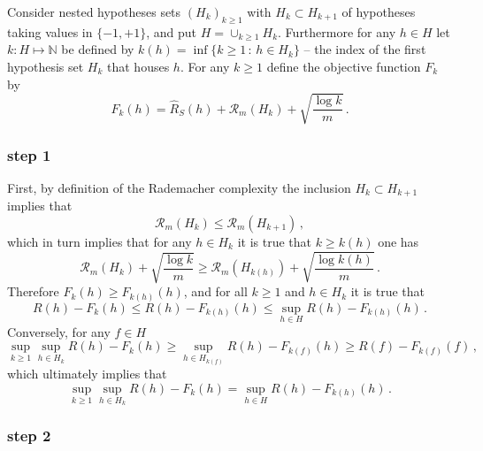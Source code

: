\documentclass[a4paper]{article}
\begin{document}
Consider nested hypotheses sets $(H_k)_{k\geq1}$ with $H_k\subset H_{k+1}$ of hypotheses
taking values in $\{-1,+1\}$, and put $H=\cup_{k\geq1} H_k$. Furthermore for any
$h\in H$ let $k: H\mapsto\mathbb{N}$ be defined by $k(h) = \inf\{k\geq1\,:\, h\in H_k\}$
-- the index of the first hypothesis set $H_k$ that houses $h$. For any $k\geq1$
define the objective function $F_k$ by
\[ F_k(h) = \hat{R}_S(h) + \mathcal{R}_m(H_k) + \sqrt{\frac{\log k}{m}} \,. \]

\subsubsection*{step 1} %
\label{ssub:step_1}

First, by definition of the Rademacher complexity the inclusion $H_k\subset H_{k+1}$
implies that
\[ \mathcal{R}_m(H_k) \leq \mathcal{R}_m(H_{k+1}) \,, \]
which in turn implies that for any $h\in H_k$ it is true that $k\geq k(h)$ one has
\[ \mathcal{R}_m(H_k) + \sqrt{\frac{\log k}{m}}
  \geq \mathcal{R}_m(H_{k(h)}) + \sqrt{\frac{\log {k(h)}}{m}} \,. \]
Therefore $F_k(h) \geq F_{k(h)}(h)$, and for all $k\geq1$ and $h\in H_k$ it is true
that
\[ R(h) - F_k(h) \leq R(h) - F_{k(h)}(h) \leq \sup_{h\in H} R(h) - F_{k(h)}(h) \,. \]
Conversely, for any $f\in H$
\[ \sup_{k\geq1} \sup_{h\in H_k} R(h) - F_k(h)
    \geq \sup_{h\in H_{k(f)}} R(h) - F_{k(f)}(h)
    \geq R(f) - F_{k(f)}(f)
  \,, \]
which ultimately implies that
\[ \sup_{k\geq1}\sup_{h\in H_k} R(h) - F_k(h)
    = \sup_{h\in H} R(h) - F_{k(h)}(h)
  \,. \]


\subsubsection*{step 2} %
\label{ssub:step_2}
\end{document}
